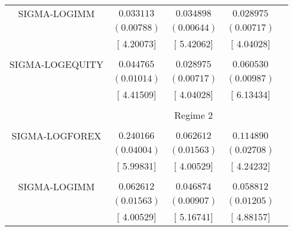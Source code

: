 \begin{tabular}{lrrrr}
\multicolumn{1}{c}{SIGMA-LOGIMM}&\multicolumn{1}{c}{$0.033113$}&\multicolumn{1}{c}{$0.034898$}&\multicolumn{1}{c}{$0.028975$}&\multicolumn{1}{c}{}\\
\multicolumn{1}{c}{}&\multicolumn{1}{c}{$(0.00788)$}&\multicolumn{1}{c}{$(0.00644)$}&\multicolumn{1}{c}{$(0.00717)$}&\multicolumn{1}{c}{}\\
\multicolumn{1}{c}{}&\multicolumn{1}{c}{[ 4.20073]}&\multicolumn{1}{c}{[ 5.42062]}&\multicolumn{1}{c}{[ 4.04028]}&\multicolumn{1}{c}{}\\
\multicolumn{1}{c}{}&\multicolumn{1}{c}{}&\multicolumn{1}{c}{}&\multicolumn{1}{c}{}&\multicolumn{1}{c}{}\\
\multicolumn{1}{c}{SIGMA-LOGEQUITY}&\multicolumn{1}{c}{$0.044765$}&\multicolumn{1}{c}{$0.028975$}&\multicolumn{1}{c}{$0.060530$}&\multicolumn{1}{c}{}\\
\multicolumn{1}{c}{}&\multicolumn{1}{c}{$(0.01014)$}&\multicolumn{1}{c}{$(0.00717)$}&\multicolumn{1}{c}{$(0.00987)$}&\multicolumn{1}{c}{}\\
\multicolumn{1}{c}{}&\multicolumn{1}{c}{[ 4.41509]}&\multicolumn{1}{c}{[ 4.04028]}&\multicolumn{1}{c}{[ 6.13434]}&\multicolumn{1}{c}{}\\
[4.5pt] \hline \\ [-4.5pt]
\multicolumn{1}{c}{}&\multicolumn{3}{c}{Regime 2}&\multicolumn{1}{c}{}\\
[4.5pt] \hline \\ [-4.5pt]
\multicolumn{1}{c}{SIGMA-LOGFOREX}&\multicolumn{1}{c}{$0.240166$}&\multicolumn{1}{c}{$0.062612$}&\multicolumn{1}{c}{$0.114890$}&\multicolumn{1}{c}{}\\
\multicolumn{1}{c}{}&\multicolumn{1}{c}{$(0.04004)$}&\multicolumn{1}{c}{$(0.01563)$}&\multicolumn{1}{c}{$(0.02708)$}&\multicolumn{1}{c}{}\\
\multicolumn{1}{c}{}&\multicolumn{1}{c}{[ 5.99831]}&\multicolumn{1}{c}{[ 4.00529]}&\multicolumn{1}{c}{[ 4.24232]}&\multicolumn{1}{c}{}\\
\multicolumn{1}{c}{}&\multicolumn{1}{c}{}&\multicolumn{1}{c}{}&\multicolumn{1}{c}{}&\multicolumn{1}{c}{}\\
\multicolumn{1}{c}{SIGMA-LOGIMM}&\multicolumn{1}{c}{$0.062612$}&\multicolumn{1}{c}{$0.046874$}&\multicolumn{1}{c}{$0.058812$}&\multicolumn{1}{c}{}\\
\multicolumn{1}{c}{}&\multicolumn{1}{c}{$(0.01563)$}&\multicolumn{1}{c}{$(0.00907)$}&\multicolumn{1}{c}{$(0.01205)$}&\multicolumn{1}{c}{}\\
\multicolumn{1}{c}{}&\multicolumn{1}{c}{[ 4.00529]}&\multicolumn{1}{c}{[ 5.16741]}&\multicolumn{1}{c}{[ 4.88157]}&\multicolumn{1}{c}{}\\

\end{tabular}
